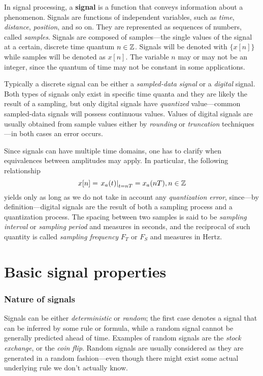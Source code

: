 \documentclass[\documentfontsize, twocolumn]{\classname}
\begin{document}
In signal processing, a \textbf{signal} is a function that conveys information
about a phenomenon. Signals are functions of independent variables, such as
\emph{time}, \emph{distance}, \emph{position}, and so on. They are represented
as se\-quen\-ces of numbers, called \emph{samples}. Signals are composed of
samples---the single values of the signal at a certain, discrete time quantum $n
\in \mathbb Z$. Signals will be denoted with $\{x[n]\}$ while samples will be denoted
as $x[n]$. The variable $n$ may or may not be an integer, since the quantum of
time may not be constant in some applications.

Typically a discrete signal can be either a \emph{sampled-data signal} or a
\emph{digital} signal. Both types of signals only exist in specific time quanta
and they are likely the result of a sampling, but only digital signals have
\emph{quantized} value---common sampled-data signals will possess continuous
values. Values of digital signals are usually obtained from sample values
either by \emph{rounding} or \emph{truncation} techniques---in both cases an
error occurs.

Since signals can have multiple time domains, one has to clarify when
equivalences between amplitudes may apply. In particular, the following
relationship \[ x[n] = \left.x_a(t)\right|_{t=nT} = x_a(nT), n \in \mathbb Z\]
yields only as long as we do not take in account any \emph{quantization error},
since---by definition---digital signals are the result of both a sampling process
and a quantization process. The spacing between two samples is said to be
\emph{sampling interval} or \emph{sampling period} and measures in seconds,
and the reciprocal of such quantity is called \emph{sampling frequency} $F_T$
or $F_S$ and measures in Hertz.

\section{Basic signal properties}

\subsubsection{Nature of signals}

Signals can be either \emph{deterministic} or \emph{random}; the first case
denotes a signal that can be inferred by some rule or formula, while a random
signal cannot be generally predicted ahead of time. Examples of random signals
are the \emph{stock exchange}, or the \emph{coin flip}. Random signals are
usually considered as they are generated in a random fashion---even though
there might exist some actual underlying rule we don't actually know.
\end{document}
